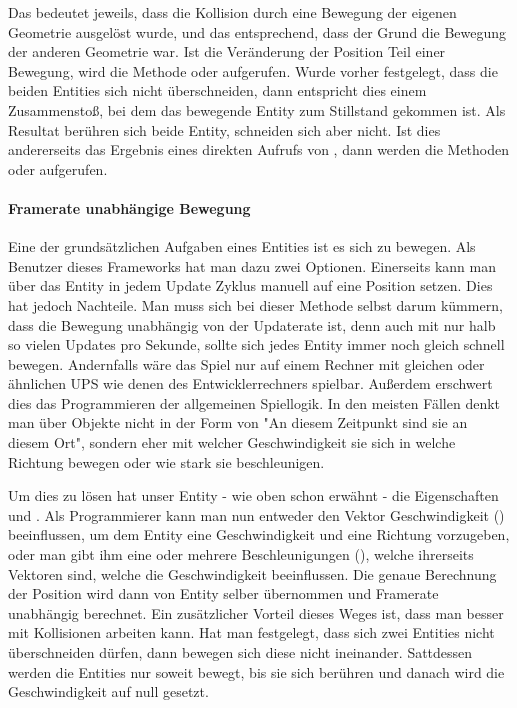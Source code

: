 Das  bedeutet jeweils, dass die Kollision durch eine Bewegung der eigenen Geometrie ausgelöst wurde, und das  entsprechend, dass der Grund die Bewegung der anderen Geometrie war.
Ist die Veränderung der Position Teil einer Bewegung, wird die Methode  oder  aufgerufen. Wurde vorher festgelegt, dass die beiden Entities sich nicht überschneiden, dann entspricht dies einem Zusammenstoß, bei dem das bewegende Entity zum Stillstand gekommen ist. Als Resultat berühren sich beide Entity, schneiden sich aber nicht.
Ist dies andererseits das Ergebnis eines direkten Aufrufs von , dann werden die Methoden  oder  aufgerufen.

\paragraph{Framerate unabhängige Bewegung}

Eine der grundsätzlichen Aufgaben eines Entities ist es sich zu bewegen. Als Benutzer dieses Frameworks hat man dazu zwei Optionen.
Einerseits kann man über  das Entity in jedem Update Zyklus manuell auf eine Position setzen.
Dies hat jedoch Nachteile. 
Man muss sich bei dieser Methode selbst darum kümmern, dass die Bewegung unabhängig von der Updaterate ist, denn auch mit nur halb so vielen Updates pro Sekunde, sollte sich jedes Entity immer noch gleich schnell bewegen. Andernfalls wäre das Spiel nur auf einem Rechner mit gleichen oder ähnlichen UPS  wie denen des Entwicklerrechners spielbar.
Außerdem erschwert dies das Programmieren der allgemeinen Spiellogik. In den meisten Fällen denkt man über Objekte nicht in der Form von "An diesem Zeitpunkt sind sie an diesem Ort", sondern eher mit welcher Geschwindigkeit sie sich in welche Richtung bewegen oder wie stark sie beschleunigen.

Um dies zu lösen hat unser Entity - wie oben schon erwähnt - die Eigenschaften  und . Als Programmierer kann man nun entweder den Vektor Geschwindigkeit () beeinflussen, um dem Entity eine Geschwindigkeit und eine Richtung vorzugeben, oder man gibt ihm eine oder mehrere Beschleunigungen (), welche ihrerseits Vektoren sind, welche die Geschwindigkeit beeinflussen. Die genaue Berechnung der Position wird dann von Entity selber übernommen und Framerate unabhängig berechnet. Ein zusätzlicher Vorteil dieses Weges ist, dass man besser mit Kollisionen arbeiten kann. Hat man festgelegt, dass sich zwei Entities nicht überschneiden dürfen, dann bewegen sich diese nicht ineinander. Sattdessen werden die Entities nur soweit bewegt, bis sie sich berühren und danach wird die Geschwindigkeit auf null gesetzt.

